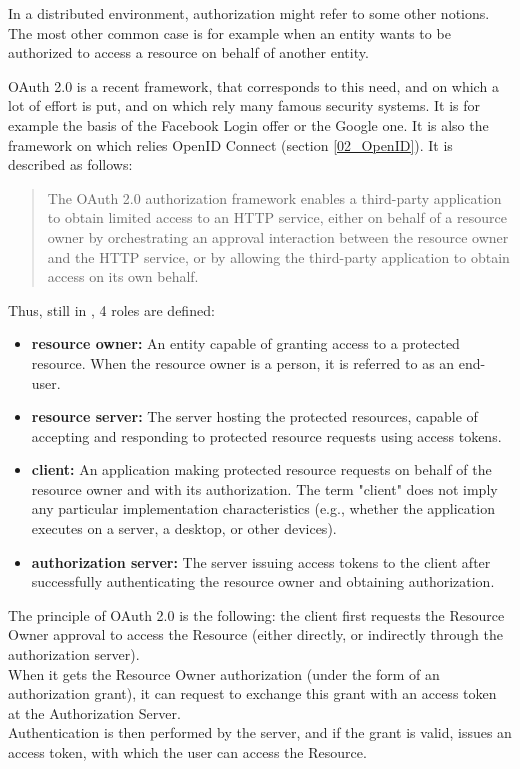 In a distributed environment, authorization might refer to some other notions. The most other common case is for example when an entity wants to be authorized to access a resource on behalf of another entity.

OAuth 2.0 is a recent framework, that corresponds to this need, and on which a lot of effort is put, and on which rely many famous security systems. It is for example the basis of the Facebook Login offer or the Google one. It is also the framework on which relies OpenID Connect (section \ref{02_OpenID}). It  is described as follows\cite{hardt2012oauth}: 

\begin{quote}
	The OAuth 2.0 authorization framework enables a third-party
	application to obtain limited access to an HTTP service, either on
	behalf of a resource owner by orchestrating an approval interaction
	between the resource owner and the HTTP service, or by allowing the
	third-party application to obtain access on its own behalf.
\end{quote}
Thus, still in \cite{hardt2012oauth}, 4 roles are defined:
\begin{itemize}
	\item \textbf{resource owner:} An entity capable of granting access to a protected resource.
	When the resource owner is a person, it is referred to as an
	end-user.
	\item \textbf{resource server:} The server hosting the protected resources, capable of accepting
	and responding to protected resource requests using access tokens.
	\item \textbf{client:} An application making protected resource requests on behalf of the
	resource owner and with its authorization.  The term "client" does
	not imply any particular implementation characteristics (e.g.,
	whether the application executes on a server, a desktop, or other
	devices).
	\item \textbf{authorization server:} The server issuing access tokens to the client after successfully
	authenticating the resource owner and obtaining authorization.
\end{itemize}

The principle of OAuth 2.0 is the following: the client first requests the Resource Owner approval to access the Resource (either directly, or indirectly through the authorization server). 
\\When it gets the Resource Owner authorization (under the form of an authorization grant), it can request to exchange this grant with an access token at the Authorization Server. 
\\Authentication is then performed by the server, and if the grant is valid, issues an access token, with which the user can access the Resource.
\\

